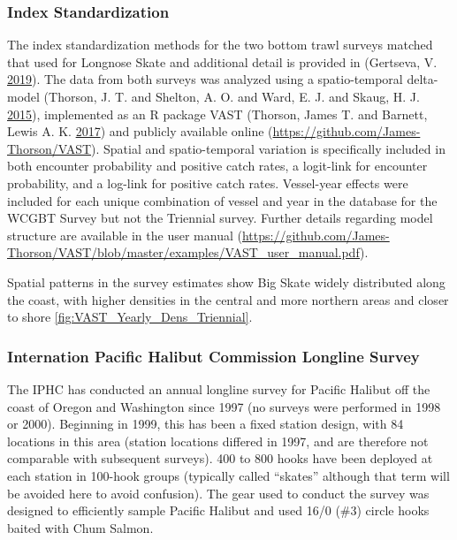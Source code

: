 \documentclass[12pt,]{article}
\begin{document}
\hypertarget{index-standardization}{%
\subsubsection{Index Standardization}\label{index-standardization}}

The index standardization methods for the two bottom trawl surveys
matched that used for Longnose Skate and additional detail is provided
in (Gertseva, V. \protect\hyperlink{ref-Gertseva2019}{2019}). The data
from both surveys was analyzed using a spatio-temporal delta-model
(Thorson, J. T. and Shelton, A. O. and Ward, E. J. and Skaug, H. J.
\protect\hyperlink{ref-Thorson2015}{2015}), implemented as an R package
VAST (Thorson, James T. and Barnett, Lewis A. K.
\protect\hyperlink{ref-Thorson2017a}{2017}) and publicly available
online (\url{https://github.com/James-Thorson/VAST}). Spatial and
spatio-temporal variation is specifically included in both encounter
probability and positive catch rates, a logit-link for encounter
probability, and a log-link for positive catch rates. Vessel-year
effects were included for each unique combination of vessel and year in
the database for the WCGBT Survey but not the Triennial survey. Further
details regarding model structure are available in the user manual
(\url{https://github.com/James-Thorson/VAST/blob/master/examples/VAST_user_manual.pdf}).

Spatial patterns in the survey estimates show Big Skate widely
distributed along the coast, with higher densities in the central and
more northern areas and closer to shore
\ref{fig:VAST_Yearly_Dens_Triennial}.

\hypertarget{internation-pacific-halibut-commission-longline-survey}{%
\subsubsection{Internation Pacific Halibut Commission Longline
Survey}\label{internation-pacific-halibut-commission-longline-survey}}

The IPHC has conducted an annual longline survey for Pacific Halibut off
the coast of Oregon and Washington since 1997 (no surveys were performed
in 1998 or 2000). Beginning in 1999, this has been a fixed station
design, with 84 locations in this area (station locations differed in
1997, and are therefore not comparable with subsequent surveys). 400 to
800 hooks have been deployed at each station in 100-hook groups
(typically called ``skates'' although that term will be avoided here to
avoid confusion). The gear used to conduct the survey was designed to
efficiently sample Pacific Halibut and used 16/0 (\#3) circle hooks
baited with Chum Salmon.
\end{document}
